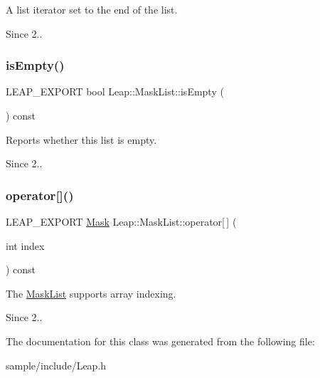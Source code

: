 A list iterator set to the end of the list. \begin{DoxySince}{Since}
2.. 
\end{DoxySince}
\mbox{\label{class_leap_1_1_mask_list_a41f3f8bb83d3addd214180c49b8a033e}} 
\subsubsection{\texorpdfstring{is\+Empty()}{isEmpty()}}
{\footnotesize\ttfamily L\+E\+A\+P\+\_\+\+E\+X\+P\+O\+RT bool Leap\+::\+Mask\+List\+::is\+Empty (\begin{DoxyParamCaption}{ }\end{DoxyParamCaption}) const}

Reports whether this list is empty. \begin{DoxySince}{Since}
2.. 
\end{DoxySince}
\mbox{\label{class_leap_1_1_mask_list_ae977a3f2ab4749d6225997969d0476c3}} 
\subsubsection{\texorpdfstring{operator[]()}{operator[]()}}
{\footnotesize\ttfamily L\+E\+A\+P\+\_\+\+E\+X\+P\+O\+RT \hyperlink{class_leap_1_1_mask}{Mask} Leap\+::\+Mask\+List\+::operator\mbox{[}$\,$\mbox{]} (\begin{DoxyParamCaption}\item[{int}]{index }\end{DoxyParamCaption}) const}

The \hyperlink{class_leap_1_1_mask_list}{Mask\+List} supports array indexing. \begin{DoxySince}{Since}
2.. 
\end{DoxySince}


The documentation for this class was generated from the following file\+:\begin{DoxyCompactItemize}
\item 
sample/include/Leap.\+h\end{DoxyCompactItemize}
